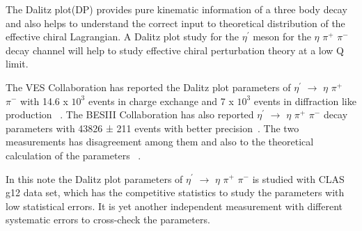 The Dalitz plot(DP) provides pure kinematic information of a three body decay and also helps to understand the correct input to theoretical distribution of the effective chiral Lagrangian. A Dalitz plot study for the $\eta^{\prime}$ meson for the $\eta$ $\pi^{+}$ $\pi^{-}$  decay channel will help to study effective chiral perturbation theory at a low Q limit.

The VES Collaboration has reported the Dalitz plot parameters of $\eta^{\prime}$ $\rightarrow$ $\eta$ $\pi^{+}$ $\pi^{-}$ with 14.6 x $10^{3}$ events in charge exchange and 7 x $10^{3}$ events in diffraction like production ~\cite{Dorofeev:2006fb}. The BESIII Collaboration has also reported $\eta^{\prime}$ $\rightarrow$ $\eta$ $\pi^{+}$ $\pi^{-}$ decay parameters with 43826 ± 211 events with better precision~\cite{Ablikim:2010kp}. The two measurements has disagreement among them and also to the theoretical calculation of the parameters ~\cite{Borasoy:2005du}. 

In this note the Dalitz plot parameters of $\eta^{\prime}$ $\rightarrow$ $\eta$ $\pi^{+}$ $\pi^{-}$ is studied with CLAS g12 data set, which has the competitive statistics to study the parameters with low statistical errors. It is yet another independent measurement with different systematic errors to cross-check the parameters.
